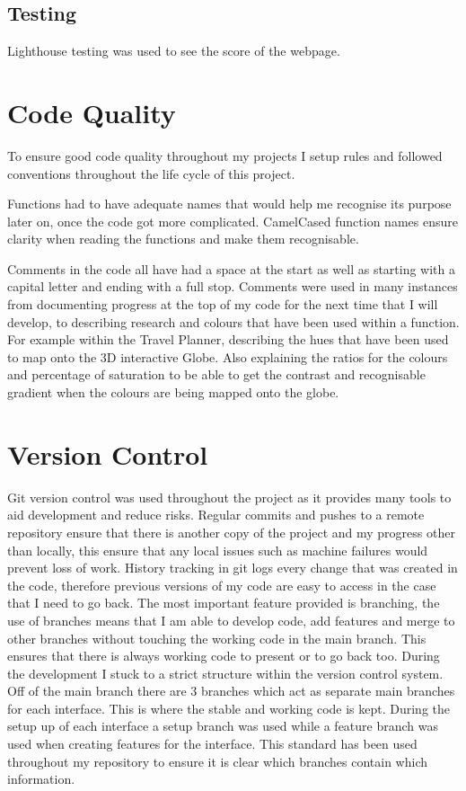\documentclass[]{project_final}
\begin{document}
\subsection{Testing}
Lighthouse testing was used to see the score of the webpage.

\section{Code Quality}
To ensure good code quality throughout my projects I setup rules and followed conventions throughout the life cycle of this project.

Functions had to have adequate names that would help me recognise its purpose later on, once the code got more complicated. CamelCased function names ensure clarity when reading the functions and make them recognisable.

Comments in the code all have had a space at the start as well as starting with a capital letter and ending with a full stop. Comments were used in many instances from documenting progress at the top of my code for the next time that I will develop, to describing research and colours that have been used within a function. For example within the Travel Planner, describing the hues that have been used to map onto the 3D interactive Globe. Also explaining the ratios for the colours and percentage of saturation to be able to get the contrast and recognisable gradient when the colours are being mapped onto the globe.


\section{Version Control}
Git version control was used throughout the project as it provides many tools to aid development and reduce risks. Regular commits and pushes to a remote repository ensure that
there is another copy of the project and my progress other than locally, this ensure that any
local issues such as machine failures would prevent loss of work.
History tracking in git logs every change that was created in the code, therefore previous
versions of my code are easy to access in the case that I need to go back.
The most important feature provided is branching, the use of branches means that I am able
to develop code, add features and merge to other branches without touching the working
code in the main branch. This ensures that there is always working code to present or to go
back too.
During the development I stuck to a strict structure within the version control system. Off of
the main branch there are 3 branches which act as separate main branches for each interface.
This is where the stable and working code is kept. During the setup up of each interface
a setup branch was used while a feature branch was used when creating features for the
interface. This standard has been used throughout my repository to ensure it is clear which
branches contain which information.
\end{document}
